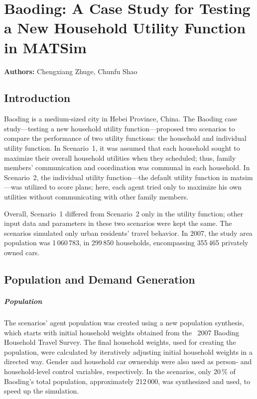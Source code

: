 \chapter{Baoding: A Case Study for Testing a New Household Utility Function in MATSim}
\label{ch:baoding}
\hfill \textbf{Authors:} Chengxiang Zhuge, Chunfu Shao



\section{Introduction}
Baoding is a medium-sized city in Hebei Province, China. 
The Baoding case study---testing a new household utility function---proposed two scenarios to compare the performance of two utility functions: the household and individual utility function. 
In Scenario~1, it was assumed that each household sought to maximize their overall household utilities when they scheduled; thus, family members' communication and coordination was communal in each household. In Scenario~2, the individual utility function---the default utility function in \gls{matsim}---was utilized to score plans; here, each agent tried only  to maximize his own utilities without communicating with other family members. 

Overall, Scenario~1 differed from Scenario~2 only in the utility function; other input data and parameters in these two scenarios were kept the same. 
The scenarios simulated only urban residents' travel behavior. 
In 2007, the study area population was 1\,060\,783, in 299\,850 households, encompassing 355\,465 privately owned cars.  

\section{Population and Demand Generation}
\paragraph{Population} The scenarios' agent population was created using a new population synthesis, which  starts with initial household weights obtained from the ~2007 Baoding  Household Travel Survey. 
The final household weights, used for creating the population, were calculated by iteratively adjusting initial household weights in a directed way. 
Gender and household car ownership were also used as person- and household-level control variables, respectively. 
In the scenarios, only 20\,\% of Baoding's total population, approximately 212\,000, was synthesized and used, to speed up the simulation. 

